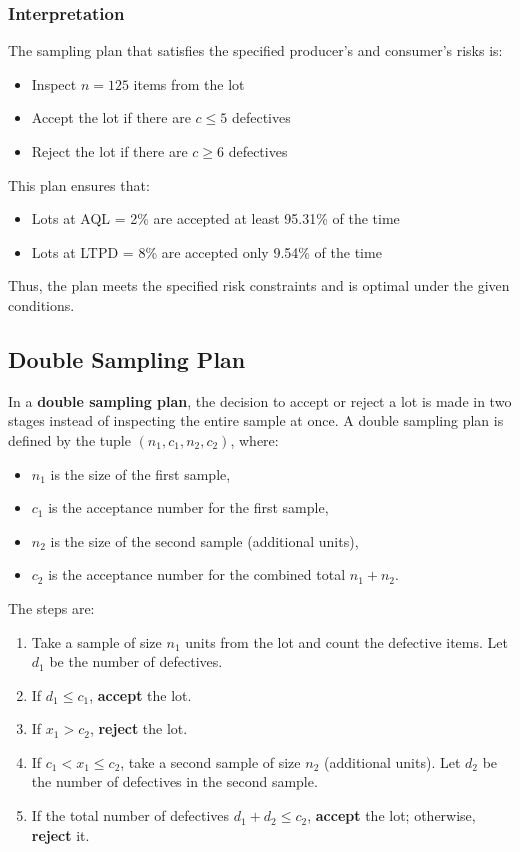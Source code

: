 \documentclass[twoside]{book}
\begin{document}
\subsubsection{Interpretation}
The sampling plan that satisfies the specified producer's and consumer's risks is:
\begin{itemize}
    \item Inspect $n = 125$ items from the lot
    \item Accept the lot if there are $c \leq 5$ defectives
    \item Reject the lot if there are $c \geq 6$ defectives
\end{itemize}

This plan ensures that:
\begin{itemize}
    \item Lots at AQL = 2\% are accepted at least 95.31\% of the time
    \item Lots at LTPD = 8\% are accepted only 9.54\% of the time
\end{itemize}

Thus, the plan meets the specified risk constraints and is optimal under the given conditions.

\subsection{Double Sampling Plan}

In a \textbf{double sampling plan}, the decision to accept or reject a lot is made in two stages instead of inspecting the entire sample at once. A double sampling plan is defined by the tuple $(n_1, c_1, n_2, c_2)$, where:
\begin{itemize}
    \item $n_1$ is the size of the first sample,
    \item $c_1$ is the acceptance number for the first sample,
    \item $n_2$ is the size of the second sample (additional units),
    \item $c_2$ is the acceptance number for the combined total $n_1 + n_2$.
\end{itemize}

The steps are:
\begin{textbox}
\begin{enumerate}
    \item Take a sample of size $n_1$ units from the lot and count the defective items. Let $d_1$ be the number of defectives.
    \item If $d_1 \leq c_1$, \textbf{accept} the lot.
    \item If $x_1 > c_2$, \textbf{reject} the lot.
    \item If $c_1 < x_1 \leq c_2$, take a second sample of size $n_2$ (additional units). Let $d_2$ be the number of defectives in the second sample.
    \item If the total number of defectives $d_1 + d_2 \leq c_2$, \textbf{accept} the lot; otherwise, \textbf{reject} it.
\end{enumerate}
\end{textbox}
\end{document}
